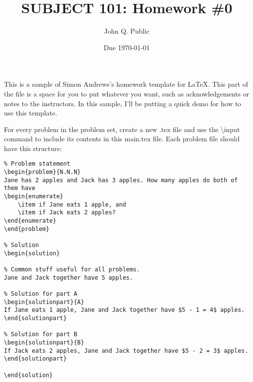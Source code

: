 \documentclass{article}
\title{SUBJECT 101: Homework \#0}
\author{John Q. Public}
\date{Due \today}
\newenvironment{problem}[1]
{ \begin{trivlist} \item[\hskip \labelsep {\bfseries\Large Problem #1}] \item }
{ \end{trivlist} }
\newenvironment{solution}
{ \begin{trivlist} \item[\hskip \labelsep {\bfseries\large Solution}] \item }
{ \end{trivlist} \newpage }
\newenvironment{solutionpart}[1]
{ \begin{trivlist} \item[\hskip \labelsep {\bfseries Part #1}] \item }
{ \end{trivlist} }
\begin{document}
\maketitle

This is a sample of Simon Andrews's homework template for \LaTeX. This part of the file is a space for you to put whatever you want, such as acknowledgements or notes to the instructors. In this sample, I'll be putting a quick demo for how to use this template.

For every problem in the problem set, create a new .tex file and use the \textbackslash input command to include its contents in this main.tex file. Each problem file should have this structure:

\begin{verbatim}
% Problem statement
\begin{problem}{N.N.N}
Jane has 2 apples and Jack has 3 apples. How many apples do both of them have
\begin{enumerate}
    \item if Jane eats 1 apple, and
    \item if Jack eats 2 apples?
\end{enumerate}
\end{problem}

% Solution
\begin{solution}

% Common stuff useful for all problems.
Jane and Jack together have 5 apples.

% Solution for part A
\begin{solutionpart}{A}
If Jane eats 1 apple, Jane and Jack together have $5 - 1 = 4$ apples.
\end{solutionpart}

% Solution for part B
\begin{solutionpart}{B}
If Jack eats 2 apples, Jane and Jack together have $5 - 2 = 3$ apples.
\end{solutionpart}

\end{solution}
\end{verbatim}

\newpage


\end{document}
